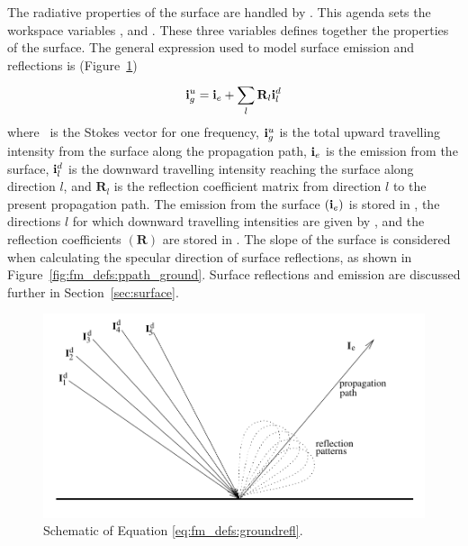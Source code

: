 \label{sec:fm_defs:groundrefl}

The radiative properties of the surface are handled by
. This agenda sets the workspace
variables ,  and
. These three variables defines
together the properties of the surface. The general
expression used to model surface emission and reflections is
(Figure~\ref{fig:fm_defs:ground_refl})
\begin{equation}
  \mathbf{i}_g^u = \mathbf{i}_e + \sum_l^{} \mathbf{R}_l \mathbf{i}_l^d
  \label{eq:fm_defs:groundrefl}
\end{equation}
where \MpiVct\ is the Stokes vector for one frequency, $\mathbf{i}_g^u$
is the total upward travelling intensity from the surface along the
propagation path, $\mathbf{i}_e$ is the emission from the surface,
$\mathbf{i}_l^d$ is the downward travelling intensity reaching the surface
along direction $l$, and $\mathbf{R}_l$ is the reflection coefficient
matrix from direction $l$ to the present propagation path. The
emission from the surface $(\mathbf{i}_e)$ is stored in
, the directions $l$ for which downward
travelling intensities are given by , and the
reflection coefficients $(\mathbf{R})$ are stored in
. The slope of the surface is
considered when calculating the specular direction of surface
reflections, as shown in Figure~\ref{fig:fm_defs:ppath_ground}.
Surface reflections and emission are discussed further
in Section~\ref{sec:surface}.

\begin{figure}[!p]
 \begin{center}
  \includegraphics*[width=0.95\hsize]{Figs/fm_definitions/ground_refl}
  \caption{Schematic of Equation \ref{eq:fm_defs:groundrefl}.}
  \label{fig:fm_defs:ground_refl}
 \end{center}
\end{figure}

